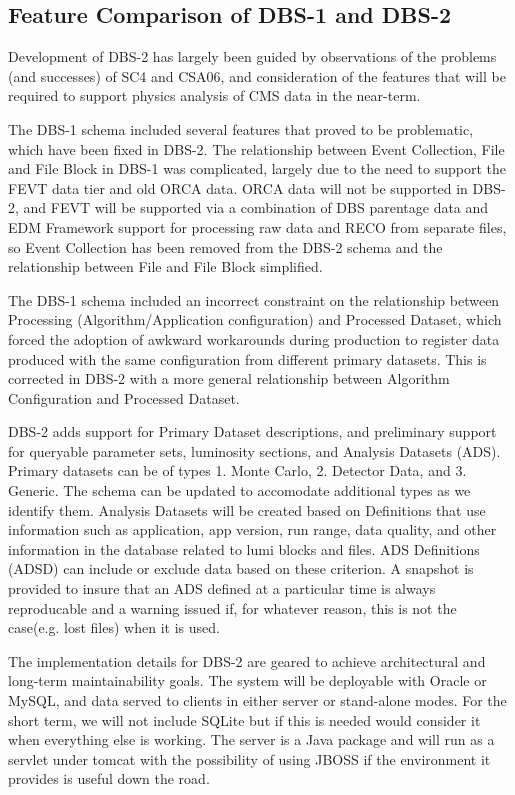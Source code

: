 \documentclass{cmspaper}
\begin{document}
\subsection{Feature Comparison of DBS-1 and DBS-2}

Development of DBS-2 has largely been guided by observations of the
problems (and successes) of SC4 and CSA06, and consideration of the
features that will be required to support physics analysis of CMS
data in the near-term.

The DBS-1 schema included several features that proved to be
problematic, which have been fixed in DBS-2.  The relationship
between Event Collection, File and File Block in DBS-1 was
complicated, largely due to the need to support the FEVT data
tier and old ORCA data.  ORCA data will not be supported in
DBS-2, and FEVT will be supported via a combination of DBS
parentage data and EDM Framework support for processing raw
data and RECO from separate files, so Event Collection has been
removed from the DBS-2 schema and the relationship between
File and File Block simplified.

The DBS-1 schema included an incorrect constraint on the
relationship between Processing (Algorithm/Application
configuration) and Processed Dataset, which forced the
adoption of awkward workarounds during production to
register data produced with the same configuration from
different primary datasets.  This is corrected in DBS-2
with a more general relationship between Algorithm Configuration
and Processed Dataset.

DBS-2 adds support for Primary Dataset descriptions,
and preliminary support for queryable parameter sets,
luminosity sections, and Analysis Datasets (ADS). Primary
datasets can be of types 1. Monte Carlo, 2. Detector Data, 
and 3. Generic. The schema can be updated to accomodate additional 
types as we identify them. Analysis Datasets will be created based on
Definitions that use information  such as application, app version, 
run range, data quality, and other information in the database related 
to lumi blocks and files. ADS Definitions (ADSD) can include or exclude 
data based on these criterion.
A snapshot is provided to insure that an ADS defined at a particular 
time is always reproducable and a warning issued if, for whatever 
reason, this is not the case(e.g. lost files) when it is used. 

The implementation details for DBS-2 are geared to achieve 
architectural and long-term maintainability goals.  The 
system will be deployable with Oracle or MySQL, and  data 
served to clients in either server or stand-alone modes. 
For the short term, we will not include SQLite but if this 
is needed would consider it when everything else is working. 
The server is a Java package and will run as a servlet under 
tomcat with the possibility of using JBOSS if the environment 
it provides is useful down the road.   
\end{document}
